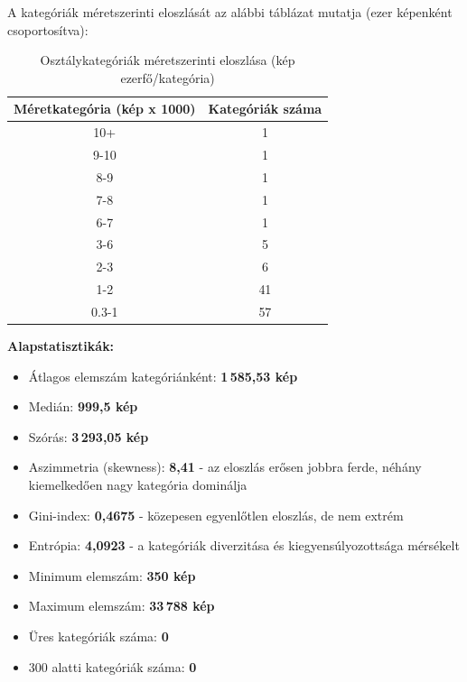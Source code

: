         A kategóriák méretszerinti eloszlását az alábbi táblázat mutatja (ezer képenként csoportosítva):
        
        \begin{table}[H]
        \centering
        \caption{Osztálykategóriák méretszerinti eloszlása (kép ezerfő/kategória)}
        \begin{tabular}{|c|c|}
        \hline
        \textbf{Méretkategória (kép x 1000)} & \textbf{Kategóriák száma} \\
        \hline
        10+     & 1 \\
        9-10    & 1 \\
        8-9     & 1 \\
        7-8     & 1 \\
        6-7     & 1 \\
        3-6     & 5 \\
        2-3     & 6 \\
        1-2     & 41 \\
        0.3-1   & 57 \\
        \hline
        \end{tabular}
        \label{tab:imagenet-size-dist}
        \end{table}
        
        \vspace{1em}
        \textbf{Alapstatisztikák:}
        
        \begin{itemize}
          \item Átlagos elemszám kategóriánként: \textbf{1\,585,53 kép}
          \item Medián: \textbf{999,5 kép}
          \item Szórás: \textbf{3\,293,05 kép}
          \item Aszimmetria (skewness): \textbf{8,41} - az eloszlás erősen jobbra ferde, néhány kiemelkedően nagy kategória dominálja
          \item Gini-index: \textbf{0,4675} - közepesen egyenlőtlen eloszlás, de nem extrém
          \item Entrópia: \textbf{4,0923} - a kategóriák diverzitása és kiegyensúlyozottsága mérsékelt
          \item Minimum elemszám: \textbf{350 kép}
          \item Maximum elemszám: \textbf{33\,788 kép}
          \item Üres kategóriák száma: \textbf{0}
          \item 300 alatti kategóriák száma: \textbf{0}
        \end{itemize}
        
